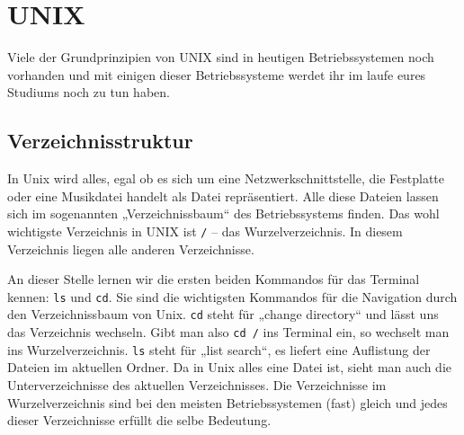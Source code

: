 \chapter{UNIX}

\lstset{language=bash}
Viele der Grundprinzipien von UNIX sind in heutigen Betriebssystemen noch vorhanden und mit einigen dieser Betriebssysteme werdet ihr im laufe eures Studiums noch zu tun haben.

\section{Verzeichnisstruktur}
In Unix wird alles, egal ob es sich um eine Netzwerkschnittstelle, die Festplatte oder eine Musikdatei handelt als Datei repräsentiert. Alle diese Dateien lassen sich im sogenannten „Verzeichnissbaum“ des Betriebssystems finden. Das wohl wichtigste Verzeichnis in UNIX ist \lstinline$/$ – das Wurzelverzeichnis. In diesem Verzeichnis liegen alle anderen Verzeichnisse.

An dieser Stelle lernen wir die ersten beiden Kommandos für das Terminal kennen: \lstinline$ls$ und \lstinline$cd$.
Sie sind die wichtigsten Kommandos für die Navigation durch den Verzeichnissbaum von Unix. \lstinline$cd$ steht für „change directory“ und lässt uns das Verzeichnis wechseln. Gibt man also \lstinline$cd /$ ins Terminal ein, so wechselt man ins Wurzelverzeichnis. \lstinline$ls$ steht für „list search“, es liefert eine Auflistung der Dateien im aktuellen Ordner.
Da in Unix alles eine Datei ist, sieht man auch die Unterverzeichnisse des aktuellen Verzeichnisses.
Die Verzeichnisse im Wurzelverzeichnis sind bei den meisten Betriebssystemen (fast) gleich und jedes dieser Verzeichnisse erfüllt die selbe Bedeutung.

